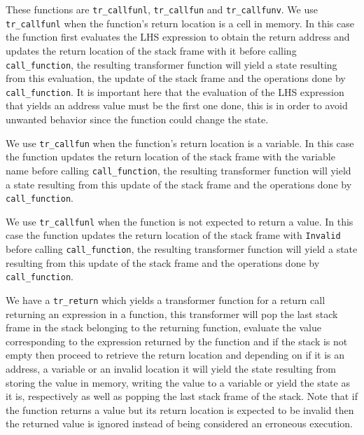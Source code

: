 These functions are \verb|tr_callfunl|, \verb|tr_callfun| and \verb|tr_callfunv|.
We use \verb|tr_callfunl| when the function's return location is a cell in memory.
In this case the function first evaluates the LHS expression to obtain the return address and updates the return location of the stack frame with it before calling \verb|call_function|, the resulting transformer function will yield a state resulting from this evaluation, the update of the stack frame and the operations done by \verb|call_function|.
It is important here that the evaluation of the LHS expression that yields an address value must be the first one done, this is in order to avoid unwanted behavior since the function could change the state.

\begin{comment}
You can do a better job at clarifying this!
\end{comment}

We use \verb|tr_callfun| when the function's return location is a variable.
In this case the function updates the return location of the stack frame with the variable name before calling \verb|call_function|, the resulting transformer function will yield a state resulting from this update of the stack frame and the operations done by \verb|call_function|.

We use \verb|tr_callfunl| when the function is not expected to return a value.
In this case the function updates the return location of the stack frame with \verb|Invalid| before calling \verb|call_function|, the resulting transformer function will yield a state resulting from this update of the stack frame and the operations done by \verb|call_function|.

We have a \verb|tr_return| which yields a transformer function for a return call returning an expression in a function, this transformer will pop the last stack frame in the stack belonging to the returning function, evaluate the value corresponding to the expression returned by the function and if the stack is not empty then proceed to retrieve the return location and depending on if it is an address, a variable or an invalid location it will yield the state resulting from storing the value in memory, writing the value to a variable or yield the state as it is, respectively as well as popping the last stack frame of the stack.
Note that if the function returns a value but its return location is expected to be invalid then the returned value is ignored instead of being considered an erroneous execution.

